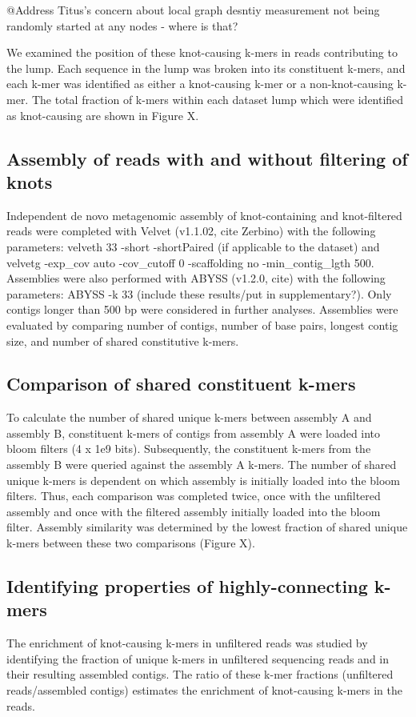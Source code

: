 \documentclass[11pt]{article} %
\begin{document}
@Address Titus's concern about local graph desntiy measurement not being randomly started at any nodes - where is that?

We examined the position of these knot-causing k-mers in reads contributing to the lump. Each sequence in the lump was broken into its constituent k-mers, and each k-mer was identified as either a knot-causing k-mer or a non-knot-causing k-mer. The total fraction of k-mers within each dataset lump which were identified as knot-causing are shown in Figure X. 

\subsection{Assembly of reads with and without filtering of knots}
Independent de novo metagenomic assembly of knot-containing and knot-filtered reads
were completed with Velvet (v1.1.02, cite Zerbino) with the following
parameters: velveth 33 -short -shortPaired (if applicable to the dataset)
and velvetg -exp\_cov auto -cov\_cutoff 0 -scaffolding no -min\_contig\_lgth
500. Assemblies were also performed with ABYSS (v1.2.0, cite) with
the following parameters: ABYSS -k 33 (include these results/put in
supplementary?). Only contigs longer than 500 bp were considered in
further analyses. Assemblies were evaluated by comparing number of
contigs, number of base pairs, longest contig size, and number of
shared constitutive k-mers. 

\subsection{Comparison of shared constituent k-mers}

To calculate the number of shared unique k-mers between assembly A and assembly B, constituent k-mers of contigs from assembly A were loaded into bloom filters (4 x 1e9 bits). Subsequently, the constituent k-mers from the assembly B were queried against
the assembly A k-mers. The number of shared unique k-mers is
dependent on which assembly is initially loaded into the bloom filters. Thus, each comparison was completed twice, once with the unfiltered
assembly and once with the filtered assembly initially loaded into the bloom
filter. Assembly similarity was determined by the lowest fraction
of shared unique k-mers between these two comparisons (Figure X). 

\subsection{Identifying properties of highly-connecting k-mers}
The enrichment of knot-causing k-mers in unfiltered reads was studied
by identifying the fraction of unique k-mers in unfiltered sequencing
reads and in their resulting assembled contigs. The ratio of these k-mer fractions (unfiltered reads/assembled contigs) estimates the enrichment of knot-causing k-mers in the reads. 
\end{document}
